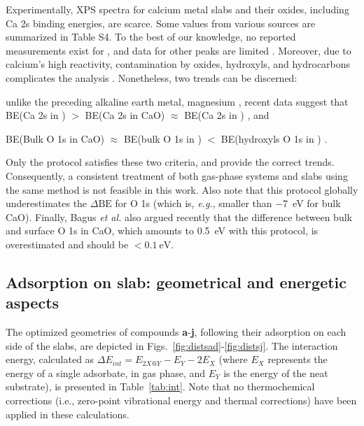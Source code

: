 \documentclass[%
aip,
amsmath,amssymb,
preprint,%
jcp,
showkeys,
]{revtex4-2}
\def\dbe{\ensuremath{\Delta\text{BE}}}
\begin{document}
Experimentally, XPS spectra for calcium metal slabs and their oxides, including Ca 2s binding energies, are scarce. Some values from various sources are summarized in Table S4. To the best of our knowledge, no reported measurements exist for , and data for other peaks are limited \cite{franzenXPSSpectraCrystalline1977,sveinbjornssonIonicConductivityFormation2014}. Moreover, due to calcium's high reactivity, contamination by oxides, hydroxyls, and hydrocarbons complicates the analysis \cite{dupinSystematicXPSStudies2000,bebenseeAdsorptionOxygenWater2008,fujimoriInteractionWaterCaO2016a,cristXPSLibraryWebsite2021a}. Nonetheless, two trends can be discerned: \begin{inparaenum}[(i)]
	\item unlike the preceding alkaline earth metal, magnesium \cite{dobrovolskyXPSStudyInfluence2017}, recent data suggest that BE(Ca 2s in ) $>$ BE(Ca 2s in CaO) $\approx$ BE(Ca 2s in ) \cite{ochsCO2ChemisorptionCa1998,cristHandbookMonochromaticXPS2000a,cristXPSLibraryWebsite2021a}, and 
	\item BE(Bulk O 1s in CaO) $\approx$ BE(bulk O 1s in ) $<$ BE(hydroxyls O 1s in ) \cite{dupinSystematicXPSStudies2000,bebenseeAdsorptionOxygenWater2008,fujimoriInteractionWaterCaO2016a,cristXPSLibraryWebsite2021a}.
\end{inparaenum}
Only the  protocol satisfies these two criteria, and provide the correct trends. Consequently, a consistent treatment of both gas-phase systems and slabs using the same method is not feasible in this work. Also note that this protocol globally underestimates the \dbe{} for O 1s (which is, \textit{e.g.}, smaller than \SI{-7}{\electronvolt} for bulk CaO\cite{cristXPSLibraryWebsite2021a}). Finally, Bagus \emph{et al.}\cite{bagusRevisitingSurfaceCorelevel2019} also argued recently that the difference between bulk and surface O 1s in CaO, which amounts to \SI{0.5}{\electronvolt} with this protocol, is overestimated  and should be $<\SI{0.1}{\electronvolt}$.



\clearpage

\subsection{Adsorption on slab: geometrical and energetic aspects}\label{sec:geom}

The optimized geometries of compounds \textbf{a}-\textbf{j}, following their adsorption on each side of the slabs, are depicted in Figs.~\ref{fig:distsad}-\ref{fig:distsj}. The interaction energy, calculated as $\Delta E_{int} = E_{2X@Y} - E_Y - 2E_X$ (where $E_X$ represents the energy of a single adsorbate,  in  gas phase, and $E_Y$ is the energy of the neat substrate), is presented in Table~\ref{tab:int}. Note that no thermochemical corrections (i.e., zero-point vibrational energy and thermal corrections) have been applied in these calculations.
\end{document}

